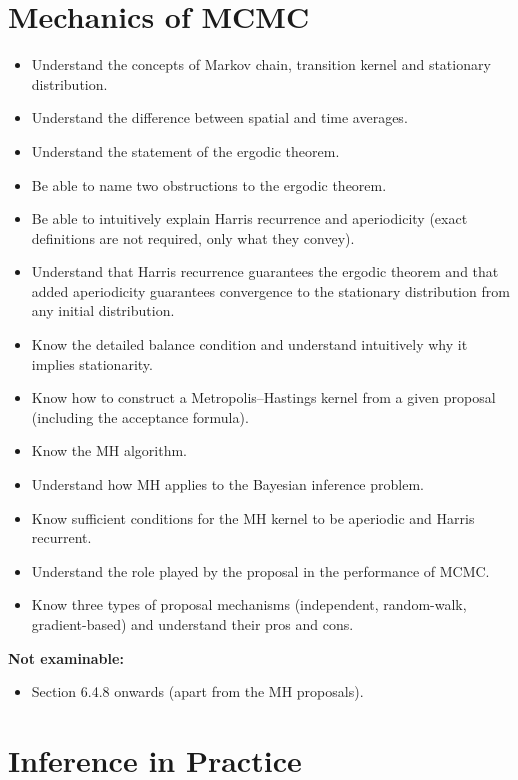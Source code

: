 \documentclass[11pt, a4paper]{article}
\newcommand{\notexaminable}[1]{%
  \begin{notebox}
    \footnotesize\textbf{Not examinable:}\vspace{2pt}
    \begin{itemize}[topsep=1pt, itemsep=1pt, leftmargin=1.2em]
      #1
    \end{itemize}
  \end{notebox}%
}
\begin{document}
\section{Mechanics of MCMC}

\begin{itemize}
  \item Understand the concepts of Markov chain, transition kernel and stationary distribution.
  \item Understand the difference between spatial and time averages.
  \item Understand the statement of the ergodic theorem.
  \item Be able to name two obstructions to the ergodic theorem.
  \item Be able to intuitively explain Harris recurrence and aperiodicity (exact definitions are not required, only what they convey).
  \item Understand that Harris recurrence guarantees the ergodic theorem and that added aperiodicity guarantees convergence to the stationary distribution from any initial distribution.
  \item Know the detailed balance condition and understand intuitively why it implies stationarity.
  \item Know how to construct a Metropolis--Hastings kernel from a given proposal (including the acceptance formula).
  \item Know the MH algorithm.
  \item Understand how MH applies to the Bayesian inference problem.
  \item Know sufficient conditions for the MH kernel to be aperiodic and Harris recurrent.
  \item Understand the role played by the proposal in the performance of MCMC.
  \item Know three types of proposal mechanisms (independent, random-walk, gradient-based) and understand their pros and cons.
\end{itemize}

\notexaminable{
  \item Section 6.4.8 onwards (apart from the MH proposals).
}

\section{Inference in Practice}
\end{document}
